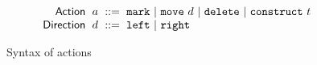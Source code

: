 \begin{figure}
  \vspace{-3px}
  \[
  \arraycolsep=3pt\begin{array}{rlrl}
      \mathsf{Action} & \action & ::= &
        \actionlit{mark} ~\vert~
        \actionlit{move}~\direction ~\vert~
        \actionlit{delete} ~\vert~
        \actionlit{construct}~\tile \\
      \mathsf{Direction} & \direction & ::= &
        \texttt{left} ~\vert~
        \texttt{right}
  \end{array}\]
  \caption{Syntax of actions}
  \label{fig:action-syntax}
\end{figure}
